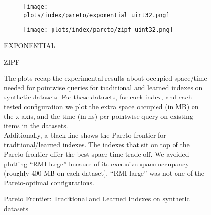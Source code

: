 \documentclass{article}
\begin{document}
\begin{figure}[!htbp]
{\begin{minipage}[t][0.98\textheight][t]{\textwidth}
    \begin{minipage}{0.48\linewidth}
        \begin{figure}[H]
        \texttt{[image: plots/index/pareto/exponential\_uint32.png]}
        \end{figure}
    \end{minipage}
    \begin{minipage}{0.48\linewidth}
        \begin{figure}[H]
        \texttt{[image: plots/index/pareto/zipf\_uint32.png]}
        \end{figure}
    \end{minipage}
    \begin{minipage}{0.48\linewidth}
    \begin{center}
        EXPONENTIAL
    \end{center}
    \end{minipage}
    \begin{minipage}{0.48\linewidth}
    \begin{center}
        ZIPF
    \end{center}
    \end{minipage}

    \vspace{20px}
    
    \begin{minipage}{\linewidth}
    The plots recap the experimental results about occupied space/time needed for pointwise queries for traditional and learned indexes on synthetic datasets. For these datasets, for each index, and each tested configuration we plot the extra space occupied (in MB) on the x-axis, and the time (in ns) per pointwise query on existing items in the datasets. \\

    Additionally, a black line shows the Pareto frontier for traditional/learned indexes. The indexes that sit on top of the Pareto frontier offer the best space-time trade-off.  
    We avoided plotting ``RMI-large'' because of its excessive space occupancy (roughly 400 MB on each dataset). ``RMI-large'' was not one of the Pareto-optimal configurations.
    \end{minipage}
    \vspace{10px}
\end{minipage}
}
\caption{Pareto Frontier: Traditional and Learned Indexes on synthetic datasets}
\end{figure}
\end{document}
